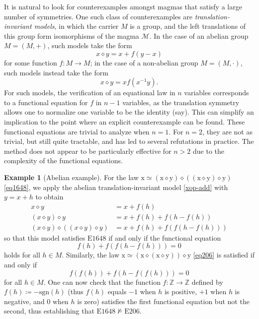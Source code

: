 \documentclass[12pt]{amsart}
\theoremstyle{definition}
\newtheorem{example}[theorem]{Example}
\newcommand{\Z}{\mathbb{Z}}
\newcommand{\x}{\mathrm{x}}
\newcommand{\y}{\mathrm{y}}
\newcommand{\op}{\diamond}
\newcommand{\formaleq}{\simeq}
\newcommand{\nmodels}{\not\models}
\newcommand{\Magma}{{\mathcal{M}}}
\newcommand{\Eq}[1]{\mathrm{E}#1}
\begin{document}
It is natural to look for counterexamples amongst magmas that satisfy a large number of symmetries.  One such class of counterexamples are \emph{translation-invariant models}, in which the carrier $M$ is a group, and the left translations of this group form isomorphisms of the magma $\Magma$.  In the case of an abelian group $M = (M,+)$, such models take the form
\begin{equation}\label{xop-add}
  x \op y = x + f(y-x)
\end{equation}
for some function $f \colon M \to M$; in the case of a non-abelian group $M = (M,\cdot)$, such models instead take the form
\begin{equation*}
x \op y = x f(x^{-1} y).
\end{equation*}
For such models, the verification of an equational law in $n$ variables corresponds to a functional equation for $f$ in $n-1$ variables, as the translation symmetry allows one to normalize one variable to be the identity (say). This can simplify an implication to the point where an explicit counterexample can be found.  These functional equations are trivial to analyze when $n=1$.  For $n=2$, they are not as trivial, but still quite tractable, and has led to several refutations in practice.  The method does not appear to be particularly effective for $n>2$ due to the complexity of the functional equations.

\begin{example}[Abelian example]\label{abex}  For the law $\x \formaleq (\x \op \y) \op ((\x \op \y) \op \y)$ \eqref{eq1648}, we apply the abelian translation-invariant model \eqref{xop-add} with $y=x+h$ to obtain
\begin{align*}
  x \op y &= x + f(h) \\
  (x \op y) \op y &= x + f(h) + f(h-f(h)) \\
  (x \op y) \op ((x \op y) \op y) &= x + f(h) + f(f(h-f(h)))
\end{align*}
so that this model satisfies $\Eq{1648}$ if and only if the functional equation
$$f(h) + f(f(h-f(h))) = 0$$
holds for all $h \in M$.  Similarly, the law $\x \formaleq (\x \op (\x \op \y)) \op \y$ \eqref{eq206} is satisfied if and only if
$$ f(f(h)) + f(h - f(f(h))) = 0$$
for all $h \in M$.  One can now check that the function $f \colon \Z \to \Z$ defined by $f(h) \coloneqq - \mathrm{sgn}(h)$ (thus $f(h)$ equals $-1$ when $h$ is positive, $+1$ when $h$ is negative, and $0$ when $h$ is zero) satisfies the first functional equation but not the second, thus establishing that $\Eq{1648} \nmodels \Eq{206}$.
\end{example}
\end{document}
